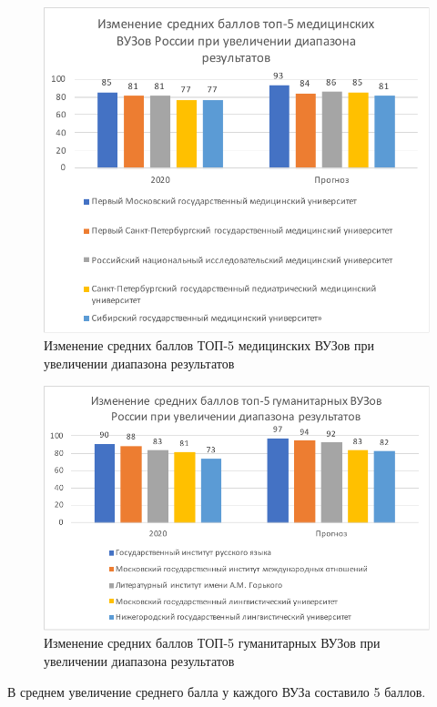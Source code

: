 \begin{figure}[hbtp]
	\centering
	\includegraphics[scale=1.0]{img/top5meddur.pdf.pdf}
	\caption{Изменение средних баллов ТОП-5 медицинских ВУЗов при увеличении диапазона результатов}
	\label{top5meddur}
\end{figure} 

\begin{figure}[hbtp]
	\centering
	\includegraphics[scale=1.0]{img/top5gymdur.pdf.pdf}
	\caption{Изменение средних баллов ТОП-5 гуманитарных ВУЗов при увеличении диапазона результатов}
	\label{top5gymdur}
\end{figure} 	

В среднем увеличение среднего балла у каждого ВУЗа составило 5 баллов.

\pagebreak